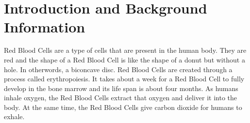 \section{Introduction and Background Information}

Red Blood Cells are a type of cells that are present in the human body. They are red and the shape of a Red Blood Cell is like the shape of a donut but without a hole. In otherwords, a biconcave disc. \cite{article1} Red Blood Cells are created through a process called erythropoiesis. It takes about a week for a Red Blood Cell to fully develop in the bone marrow and its life span is about four months. \cite{article2} As humans inhale oxygen, the Red Blood Cells extract that oxygen and deliver it into the body. At the same time, the Red Blood Cells give carbon dioxide for humans to exhale. \cite{web1}
